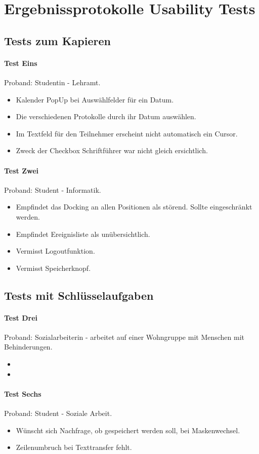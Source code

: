 \section{Ergebnissprotokolle Usability Tests}
\subsection{Tests zum Kapieren}
\paragraph*{Test Eins}
Proband: Studentin - Lehramt. 
\begin{itemize}
	\item Kalender PopUp bei Auswählfelder für ein Datum.
	\item Die verschiedenen Protokolle durch ihr Datum auswählen.
	\item Im Textfeld für den Teilnehmer erscheint nicht automatisch ein Cursor.
	\item Zweck der Checkbox Schriftführer war nicht gleich ersichtlich.

\end{itemize}

\paragraph*{Test Zwei}
Proband: Student - Informatik. 
\begin{itemize}
	\item Empfindet das Docking an allen Positionen als störend. Sollte eingeschränkt werden.
	\item Empfindet Ereignisliste als unübersichtlich.
	\item Vermisst Logoutfunktion.
	\item Vermisst Speicherknopf.
\end{itemize}

\subsection{Tests mit Schlüsselaufgaben}
\paragraph*{Test Drei}
Proband: Sozialarbeiterin - arbeitet auf einer Wohngruppe mit Menschen mit Behinderungen. 
\begin{itemize}
	\item 
	\item 
\end{itemize}

\paragraph*{Test Sechs}
Proband: Student - Soziale Arbeit. 
\begin{itemize}
	\item Wünscht sich Nachfrage, ob gespeichert werden soll, bei Maskenwechsel.
	\item Zeilenumbruch bei Texttransfer fehlt. 
\end{itemize}
